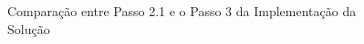 \begin{landscape}
\begin{figure}[H]
    \centering
    \qquad
    \caption{Comparação entre Passo 2.1 e o Passo 3 da Implementação da Solução}%
\end{figure}

\end{landscape}
